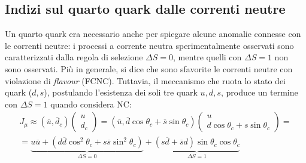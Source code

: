 \documentclass{subnucbo}
\begin{document}
\subsection{Indizi sul quarto quark dalle correnti neutre}
\label{subsec:nc_charm}
Un quarto quark era necessario anche per spiegare alcune anomalie connesse con le correnti neutre: i processi a corrente neutra sperimentalmente osservati sono caratterizzati dalla regola di selezione $\Delta S = 0$, mentre quelli con $\Delta S = 1$ non sono osservati. Più in generale, si dice che sono sfavorite le correnti neutre con violazione di \textit{flavour} (FCNC). Tuttavia, il meccanismo che ruota lo stato dei quark ($d, s$), postulando l'esistenza dei soli tre quark $u, d, s$, produce un termine con $\Delta S = 1$ quando considera NC:
\begin{equation}
        \begin{array} { c } J _ { \mu } \approx { \left( \overline { u } , \overline { d } _ { c } \right) \left( \begin{array} { c } { u } \\ { d _ { c } } \end{array} \right) = \left( \overline { u } , \overline { d } \cos \theta _ { c } + \overline { s } \sin \theta _ { c } \right) \left( \begin{array} { c } { u } \\ { d \cos \theta _ { c } + s \sin \theta _ { c } } \end{array} \right) = } \\ { = \underbrace { u \overline { u } + \left( d \overline { d } \cos ^ { 2 } \theta _ { c } + s \overline { s } \sin ^ { 2 } \theta _ { c } \right) } _ { \Delta S = 0 } + \underbrace { ( s \overline { d } + \overline { s } d ) \sin \theta _ { c } \cos \theta _ { c } } _ { \Delta S = 1 } } \end{array}
        \label{eq:gim_before}
\end{equation}
\end{document}
